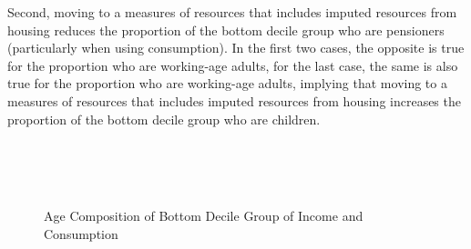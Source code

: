 Second, moving to a measures of resources that includes imputed resources from housing reduces the proportion of the bottom decile group who are pensioners (particularly when using consumption). In the first two cases, the opposite is true for the  proportion who are working-age adults, for the last case, the same is also true for the proportion who are working-age adults, implying that moving to a measures of resources that includes imputed resources from housing increases the proportion of the bottom decile group who are children.

\begin{figure}
\caption{Age Composition of Bottom Decile Group of Income and Consumption}
\centering
	 \\
	 \\
	 \\
\label{fig:age_comp}
\end{figure}

